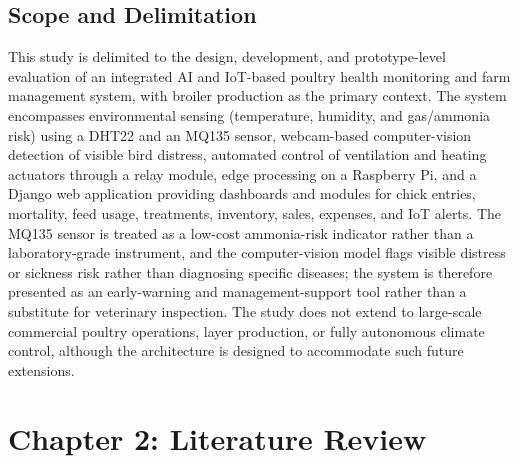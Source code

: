\documentclass[12pt,a4paper]{report}
\begin{document}
\section{Scope and Delimitation}

This study is delimited to the design, development, and prototype-level evaluation of an integrated AI and IoT-based poultry health monitoring and farm management system, with broiler production as the primary context. The system encompasses environmental sensing (temperature, humidity, and gas/ammonia risk) using a DHT22 and an MQ135 sensor, webcam-based computer-vision detection of visible bird distress, automated control of ventilation and heating actuators through a relay module, edge processing on a Raspberry Pi, and a Django web application providing dashboards and modules for chick entries, mortality, feed usage, treatments, inventory, sales, expenses, and IoT alerts. The MQ135 sensor is treated as a low-cost ammonia-risk indicator rather than a laboratory-grade instrument, and the computer-vision model flags visible distress or sickness risk rather than diagnosing specific diseases; the system is therefore presented as an early-warning and management-support tool rather than a substitute for veterinary inspection. The study does not extend to large-scale commercial poultry operations, layer production, or fully autonomous climate control, although the architecture is designed to accommodate such future extensions.

\chapter{Chapter 2: Literature Review}
\setcounter{section}{0}
\renewcommand{\thesection}{2.\arabic{section}}
\renewcommand{\thesubsection}{2.\arabic{section}.\arabic{subsection}}
\end{document}
